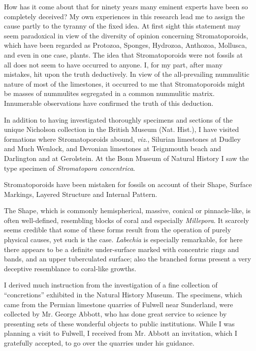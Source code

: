 \documentclass[a4paper, 12pt, oneside]{article}
\begin{document}
How has it come about that for ninety years many eminent experts have been so completely deceived? My own experiences in this research lead me to assign the cause partly to the tyranny of the fixed idea. At first sight this statement may seem paradoxical in view of the diversity of opinion concerning Stromatoporoids, which have been regarded as Protozoa, Sponges, Hydrozoa, Anthozoa, Mollusca, and even in one case, plants. The idea that Stromatoporoids were not fossils at all does not seem to have occurred to anyone. I, for my part, after many mistakes, hit upon the truth deductively. In view of the all-prevailing nummulitic nature of most of the limestones, it occurred to me that Stromatoporoids might be masses of nummulites segregated in a common nummulitic matrix. Innumerable observations have confirmed the truth of this deduction.

In addition to having investigated thoroughly specimens and sections of the unique Nicholson collection in the British Museum (Nat. Hist.), I have visited formations where Stromatoporoids abound, \emph{viz.}, Silurian limestones at Dudley and Much Wenlock, and Devonian limestones at Teignmouth beach and Darlington and at Gerolstein. At the Bonn Museum of Natural History I saw the type specimen of \emph{Stromatopora concentrica}.

Stromatoporoids have been mistaken for fossils on account of their Shape, Surface Markings, Layered Structure and Internal Pattern.

The Shape, which is commonly hemispherical, massive, conical or pinnacle-like, is often well-defined, resembling blocks of coral and especially \emph{Millepora}. It scarcely seems credible that some of these forms result from the operation of purely physical causes, yet such is the case. \emph{Labechia} is especially remarkable, for here there appears to be a definite under-surface marked with concentric rings and bands, and an upper tuberculated surface; also the branched forms present a very deceptive resemblance to coral-like growths.

I derived much instruction from the investigation of a fine collection of ``concretions'' exhibited in the Natural History Museum. The specimens, which came from the Permian limestone quarries of Fulwell near Sunderland, were collected by Mr. George Abbott, who has done great service to science by presenting sets of these wonderful objects to public institutions. While I was planning a visit to Fulwell, I received from Mr. Abbott an invitation, which I gratefully accepted, to go over the quarries under his guidance.
\end{document}
